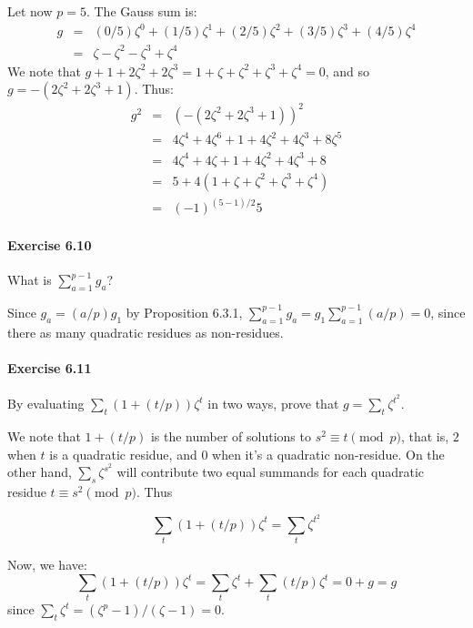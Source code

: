 \documentclass[notitlepage]{article}
\theoremstyle{definition}
\begin{document}
Let now $p = 5$. The Gauss sum is:
\begin{eqnarray}
  g  &=& (0/5) \zeta^0 + (1/5) \zeta^1 + (2/5) \zeta^2 + (3/5) \zeta^3 + (4/5) \zeta^4 \\
     &=& \zeta - \zeta^2 - \zeta^3 + \zeta^4
\end{eqnarray}
We note that
$g + 1 + 2 \zeta^2 + 2 \zeta^3 = 1 + \zeta + \zeta^2 + \zeta^3 +
\zeta^4 = 0$, and so $g = -(2 \zeta^2 + 2\zeta^3 + 1)$. Thus:
\begin{eqnarray}
  g^2  &=& (-(2 \zeta^2 + 2\zeta^3 + 1))^2 \\
       &=& 4 \zeta^4 + 4 \zeta^6 + 1 + 4 \zeta^2 + 4 \zeta^3 + 8 \zeta^5 \\
       &=& 4 \zeta^4 + 4 \zeta + 1 + 4 \zeta^2 + 4 \zeta^3  + 8 \\
       &=& 5 + 4(1 + \zeta + \zeta^2 + \zeta^3 + \zeta^4) \\
       &=& (-1)^{(5-1)/2} 5
\end{eqnarray}

\paragraph{Exercise 6.10}
What is $\sum_{a=1}^{p-1} g_a$?

Since $g_a = (a/p)g_1$ by Proposition 6.3.1,
$\sum_{a=1}^{p-1} g_a = g_1 \sum_{a=1}^{p-1} (a/p) = 0$, since there
as many quadratic residues as non-residues.

\paragraph{Exercise 6.11}
By evaluating $\sum_t (1+(t/p)) \zeta^t$ in two ways, prove that $g = \sum_t \zeta^{t^2}$.

We note that $1+(t/p)$ is the number of solutions to
$s^2 \equiv t \pmod p$, that is, $2$ when $t$ is a quadratic residue,
and $0$ when it's a quadratic non-residue. On the other hand,
$\sum_s \zeta^{s^2}$ will contribute two equal summands for each
quadratic residue $t \equiv s^2 \pmod p$. Thus

\begin{equation}
  \sum_t (1+(t/p)) \zeta^t = \sum_t \zeta^{t^2}
\end{equation}

Now, we have:
\begin{equation}
  \sum_t (1+(t/p)) \zeta^t = \sum_t \zeta^t + \sum_t (t/p) \zeta^t = 0 + g = g
\end{equation}
since $\sum_t \zeta^t = (\zeta^p - 1)/(\zeta-1) = 0$.
\end{document}
